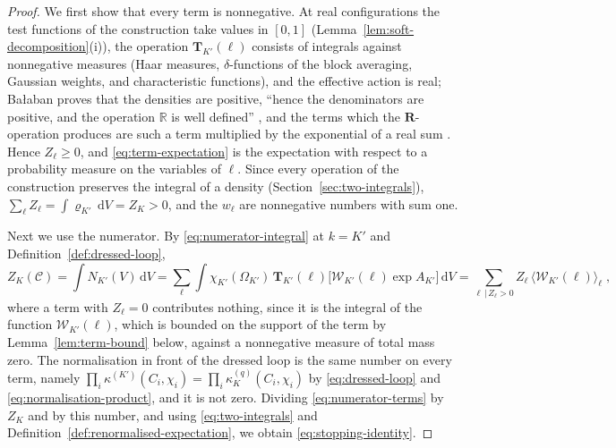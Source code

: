\documentclass[11pt]{preprint}
\newcommand{\dd}{\mathrm{d}}
\numberwithin{equation}{section}
\theoremstyle{definition}
\theoremstyle{remark}
\theoremstyle{plain}
\begin{document}
\begin{proof}
We first show that every term is nonnegative. At real configurations the test functions of the construction take values in $[0, 1]$ (Lemma~\ref{lem:soft-decomposition}(i)), the operation $\mathbf T_{K'}(\ell)$ consists of integrals against nonnegative measures (Haar measures, $\delta$-functions of the block averaging, Gaussian weights, and characteristic functions), and the effective action is real; Ba{\l}aban proves that the densities are positive, ``hence the denominators are positive, and the operation $\mathbb R$ is well defined'' \cite[p.~176]{BalabanLFR1}, and the terms which the $\mathbf R$-operation produces are such a term multiplied by the exponential of a real sum \cite[(0.6), p.~176]{BalabanLFR1}. Hence $Z_\ell \geq 0$, and \eqref{eq:term-expectation} is the expectation with respect to a probability measure on the variables of $\ell$. Since every operation of the construction preserves the integral of a density (Section~\ref{sec:two-integrals}), $\sum_\ell Z_\ell = \int\varrho_{K'}\,\dd V = Z_K > 0$, and the $w_\ell$ are nonnegative numbers with sum one.

Next we use the numerator. By \eqref{eq:numerator-integral} at $k = K'$ and Definition~\ref{def:dressed-loop},
\begin{equation}\label{eq:numerator-terms}
    Z_K(\mathcal C) = \int N_{K'}(V)\,\dd V = \sum_\ell\int\chi_{K'}(\Omega_{K'})\,\mathbf T_{K'}(\ell)\bigl[\mathcal W_{K'}(\ell)\exp A_{K'}\bigr]\,\dd V = \sum_{\ell \,|\, Z_\ell > 0}Z_\ell\,\bigl\langle\mathcal W_{K'}(\ell)\bigr\rangle_\ell\;,
\end{equation}
where a term with $Z_\ell = 0$ contributes nothing, since it is the integral of the function $\mathcal W_{K'}(\ell)$, which is bounded on the support of the term by Lemma~\ref{lem:term-bound} below, against a nonnegative measure of total mass zero. The normalisation in front of the dressed loop is the same number on every term, namely $\prod_i\kappa^{(K')}(C_i, \chi_i) = \prod_i\kappa^{(q)}_K(C_i, \chi_i)$ by \eqref{eq:dressed-loop} and \eqref{eq:normalisation-product}, and it is not zero. Dividing \eqref{eq:numerator-terms} by $Z_K$ and by this number, and using \eqref{eq:two-integrals} and Definition~\ref{def:renormalised-expectation}, we obtain \eqref{eq:stopping-identity}.


\end{proof}
\end{document}

